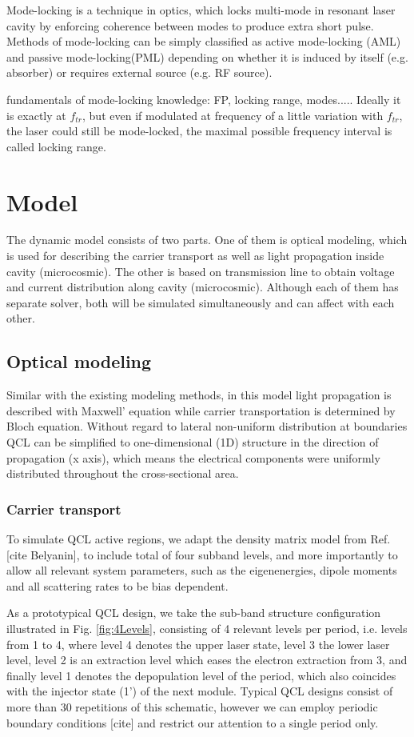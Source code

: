 \documentclass[11pt,final]{scrbook}
\begin{document}
Mode-locking is a technique in optics, which locks multi-mode in resonant laser cavity by enforcing coherence between modes to produce extra short pulse\cite{haus2000mode}. Methods of mode-locking can be simply classified as active mode-locking (AML) and passive mode-locking(PML) depending on whether it is induced by itself (e.g. absorber) or requires external source (e.g. RF source).

fundamentals of mode-locking knowledge: FP, locking range, modes.....
Ideally it is exactly at $ f_{tr}$, but even if modulated at frequency of a little variation with $ f_{tr}$, the laser could still be mode-locked, the maximal possible frequency interval is called locking range.
\chapter{Model}
The dynamic model consists of two parts. One of them is optical modeling, which is used for describing the carrier transport  as well as light propagation inside cavity (microcosmic). The other is based on transmission line to obtain voltage and current distribution along cavity (microcosmic). Although each of them has separate solver, both will be simulated simultaneously and can affect with each other.
\section{Optical modeling}
Similar with the existing modeling methods, in this model light propagation is described with Maxwell' equation while carrier transportation is determined by Bloch equation. Without regard to lateral non-uniform distribution at boundaries \cite{huang2014non, dhar2015nanoscopic} QCL can be simplified to one-dimensional (1D) structure in the direction of propagation (x axis), which means the electrical components were uniformly distributed throughout the cross-sectional area. 

\subsection{Carrier transport}
To simulate QCL active regions, we adapt the density matrix model from Ref. [cite Belyanin], to include total of four subband levels, and more importantly to allow all relevant system parameters, such as the eigenenergies, dipole moments and all scattering rates to be bias dependent. 

As a prototypical QCL design, we take the sub-band structure configuration illustrated in Fig. \ref{fig:4Levels}, consisting of 4 relevant levels per period, i.e. levels from 1 to 4, where level 4 denotes the upper laser state, level 3 the lower laser level, level 2 is an extraction level which eases the electron extraction from 3, and finally level 1 denotes the depopulation level of the period, which also coincides with the injector state (1') of the next module. Typical QCL designs consist of more than 30 repetitions of this schematic, however we can employ periodic boundary conditions [cite] and restrict our attention to a single period only. 
\end{document}
